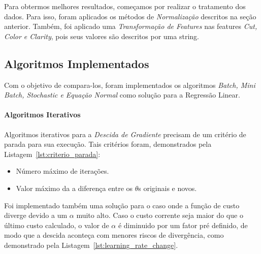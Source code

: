 \documentclass[conference]{IEEEtran}
\newenvironment{filecode}[1][]
{\minipage{0.9\linewidth}%
	\lstset{basicstyle=\ttfamily\footnotesize,frame=single,float=ht,#1}}
{\endminipage}%
\begin{document}
Para obtermos melhores resultados, começamos por realizar o tratamento dos dados. Para isso, foram aplicados os métodos de \textit{Normalização} descritos na seção anterior. Também, foi aplicado uma \textit{Transformação de Features} nas features \textit{Cut, Color e Clarity}, pois seus valores são descritos por uma string.

\subsection{Algoritmos Implementados}

Com o objetivo de compara-los, foram implementados os algoritmos \textit{Batch, Mini Batch, Stochastic e Equação Normal} como solução para a Regressão Linear.

\paragraph{Algoritmos Iterativos}

Algoritmos iterativos para a \textit{Descida de Gradiente} precisam de um critério de parada para sua execução. Tais critérios foram, demonstrados pela Listagem~\ref{lst:criterio_parada}:

\begin{itemize}
  \item Número máximo de iterações.
  \item Valor máximo da a diferença entre os $\theta$s originais e novos.
\end{itemize}

\begin{filecode}[label=lst:criterio_parada,caption=Criterios de Parada para os algoritmos de Descida do Gradiente]
  \lstset{numbers=left}
	
\end{filecode}

Foi implementado também uma solução para o caso onde a função de custo diverge devido a um $\alpha$ muito alto. Caso o custo corrente seja maior do que o último custo calculado, o valor de $\alpha$ é diminuido por um fator pré definido, de modo que a descida aconteça com menores riscos de divergência, como demonstrado pela Listagem~\ref{lst:learning_rate_change}.

\begin{filecode}[label=lst:learning_rate_change,caption=Modo como o fator $\alpha$ é modificado]
  \lstset{numbers=left}
	
\end{filecode}
\end{document}
